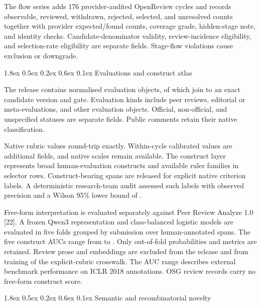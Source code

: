 \documentclass[
  10pt,
]{article}
\makeatletter
\renewcommand\subsubsection{\@startsection{subsubsection}{3}{\z@}%
  {1.8ex \@plus 0.5ex \@minus 0.2ex}%
  {0.6ex \@plus 0.1ex}%
  {\normalfont\normalsize\sffamily\bfseries\color{OSGInk}}}
\makeatother
\begin{document}
The flow series adds 176 provider-audited OpenReview cycles and records
observable, reviewed, withdrawn, rejected, selected, and unresolved
counts together with provider expected/found counts, coverage grade,
hidden-stage note, and identity checks. Candidate-denominator validity,
review-incidence eligibility, and selection-rate eligibility are
separate fields. Stage-flow violations cause exclusion or downgrade.

\subsubsection{Evaluations and construct
atlas}\label{52-evaluations-and-construct-atlas}

The release contains \OSGClaimEvaluationObjects{} normalised evaluation
objects, of which \OSGClaimExactEvaluationJoins{} join to an exact candidate
version and gate.
Evaluation kinds include peer reviews, editorial or meta-evaluations,
and other evaluation objects. Official, non-official, and unspecified
statuses are separate fields. Public comments retain their native
classification.

Native rubric values round-trip exactly. Within-cycle calibrated values
are additional fields, and native scales remain available. The
construct layer represents \OSGClaimConstructAtlasConstructs{} broad
human-evaluation constructs and \OSGClaimConstructAtlasRulers{} available
ruler families in \OSGClaimConstructAtlasSelectors{} selector rows.
Construct-bearing spans are released for explicit native criterion
labels. A deterministic research-team audit assessed
\OSGClaimConstructSpanAuditN{} such labels with observed precision
\OSGClaimConstructSpanPrecision{} and a Wilson 95\% lower bound of
\OSGClaimConstructSpanPrecisionLower{}.

Free-form interpretation is evaluated separately against Peer Review
Analyze 1.0 {[}22{]}. A frozen Qwen3 representation and class-balanced
logistic models are evaluated in five folds grouped by submission over
\OSGClaimHumanReviewSpans{} human-annotated spans. The five construct AUCs
range from \OSGClaimHumanReviewMinAuc{} to
\OSGClaimHumanReviewMaxAuc{}. Only out-of-fold probabilities and metrics
are retained. Review prose and embeddings are excluded from the release
and from training of the explicit-rubric crosswalk. The AUC range
describes external benchmark performance on ICLR 2018 annotations. OSG
review records carry no free-form construct score.

\subsubsection{Semantic and recombinatorial
novelty}\label{53-semantic-and-recombinatorial-novelty}
\end{document}
